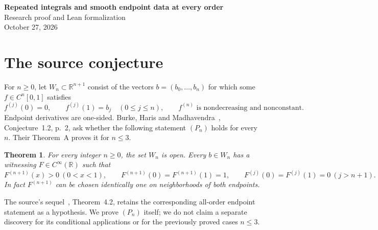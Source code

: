 \documentclass[11pt]{article}
\newtheorem{theorem}{Theorem}
\newcommand{\R}{\mathbb R}
\begin{document}
\begin{center}
{\Large\bfseries Repeated integrals and smooth endpoint data at every order}\\[.5em]
Research proof and Lean formalization\\
October 27, 2026
\end{center}
\begin{abstract}
We prove the all-order endpoint-data conjecture of Burke, Haris and
Madhavendra. The Stieltjes measure of a continuous nonconstant increasing
highest derivative is atomless and nonzero. Its finitely many moments have
a strictly positive smooth representing density equal to one near both
endpoints. A direct separation argument proves this representation, and
repeated integration supplies the required endpoint derivatives. The
admissible endpoint-data set is an invertible linear image of an open
convex smooth-moment image. The full all-order source statement is
formally verified in Lean, including the concrete convexity and openness
proofs and every source, measure, kernel and endpoint bridge.
\end{abstract}

\section{The source conjecture}
For $n\ge0$, let $W_n\subset\R^{n+1}$ consist of the vectors
$b=(b_0,\ldots,b_n)$ for which some $f\in C^n[0,1]$ satisfies
\begin{equation}\label{W}
 f^{(j)}(0)=0,\qquad f^{(j)}(1)=b_j\quad(0\le j\le n),
 \qquad f^{(n)}\text{ is nondecreasing and nonconstant}.
\end{equation}
Endpoint derivatives are one-sided. Burke, Haris and
Madhavendra~\cite{BHM}, Conjecture~1.2, p.~2, ask whether the following
statement $(P_n)$ holds for every $n$. Their Theorem~A proves it for $n\le3$.

\begin{theorem}\label{main}
For every integer $n\ge0$, the set $W_n$ is open. Every $b\in W_n$ has
a witnessing $F\in C^\infty(\R)$ such that
\[
 F^{(n+1)}(x)>0\ (0<x<1),\qquad
 F^{(n+1)}(0)=F^{(n+1)}(1)=1,
 \qquad F^{(j)}(0)=F^{(j)}(1)=0\ (j>n+1).
\]
In fact $F^{(n+1)}$ can be chosen identically one on neighborhoods of
both endpoints.
\end{theorem}

The source's sequel~\cite{Burke}, Theorem~4.2, retains the corresponding
all-order endpoint statement as a hypothesis. We prove $(P_n)$ itself;
we do not claim a separate discovery for its conditional applications or
for the previously proved cases $n\le3$.
\end{document}
